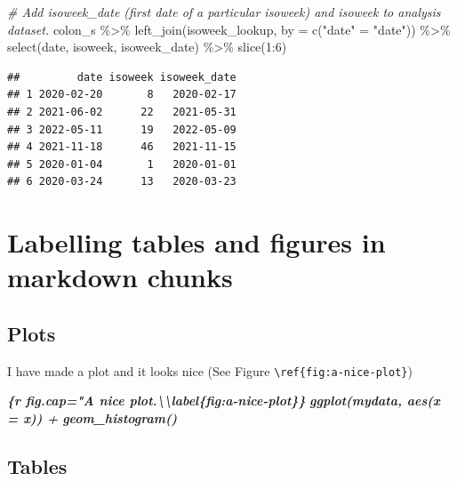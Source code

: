\documentclass[
]{book}
\newenvironment{Shaded}{\begin{snugshade}}{\end{snugshade}}
\newcommand{\AttributeTok}[1]{\textcolor[rgb]{0.77,0.63,0.00}{#1}}
\newcommand{\CommentTok}[1]{\textcolor[rgb]{0.56,0.35,0.01}{\textit{#1}}}
\newcommand{\DecValTok}[1]{\textcolor[rgb]{0.00,0.00,0.81}{#1}}
\newcommand{\FunctionTok}[1]{\textcolor[rgb]{0.00,0.00,0.00}{#1}}
\newcommand{\InformationTok}[1]{\textcolor[rgb]{0.56,0.35,0.01}{\textbf{\textit{#1}}}}
\newcommand{\NormalTok}[1]{#1}
\newcommand{\OtherTok}[1]{\textcolor[rgb]{0.56,0.35,0.01}{#1}}
\newcommand{\SpecialCharTok}[1]{\textcolor[rgb]{0.00,0.00,0.00}{#1}}
\newcommand{\StringTok}[1]{\textcolor[rgb]{0.31,0.60,0.02}{#1}}
\begin{document}
\begin{Shaded}
\begin{Highlighting}[]
\CommentTok{\# Add isoweek\_date (first date of a particular isoweek) and isoweek to analysis dataset. }
\NormalTok{colon\_s }\SpecialCharTok{\%\textgreater{}\%} 
  \FunctionTok{left\_join}\NormalTok{(isoweek\_lookup, }\AttributeTok{by =} \FunctionTok{c}\NormalTok{(}\StringTok{"date"} \OtherTok{=} \StringTok{"date"}\NormalTok{)) }\SpecialCharTok{\%\textgreater{}\%} 
  \FunctionTok{select}\NormalTok{(date, isoweek, isoweek\_date) }\SpecialCharTok{\%\textgreater{}\%} 
  \FunctionTok{slice}\NormalTok{(}\DecValTok{1}\SpecialCharTok{:}\DecValTok{6}\NormalTok{)}
\end{Highlighting}
\end{Shaded}

\begin{verbatim}
##         date isoweek isoweek_date
## 1 2020-02-20       8   2020-02-17
## 2 2021-06-02      22   2021-05-31
## 3 2022-05-11      19   2022-05-09
## 4 2021-11-18      46   2021-11-15
## 5 2020-01-04       1   2020-01-01
## 6 2020-03-24      13   2020-03-23
\end{verbatim}

\hypertarget{labelling-tables-and-figures-in-markdown-chunks}{%
\section{Labelling tables and figures in markdown chunks}\label{labelling-tables-and-figures-in-markdown-chunks}}

\hypertarget{plots}{%
\subsection{Plots}\label{plots}}

I have made a plot and it looks nice (See Figure \texttt{\textbackslash{}ref\{fig:a-nice-plot\}})

\begin{Shaded}
\begin{Highlighting}[]
\InformationTok{\textasciigrave{}\textasciigrave{}\textasciigrave{}\{r fig.cap="A nice plot.\textbackslash{}\textbackslash{}label\{fig:a{-}nice{-}plot\}\}}
\InformationTok{ggplot(mydata, aes(x = x)) +}
\InformationTok{  geom\_histogram()}
\InformationTok{\textasciigrave{}\textasciigrave{}\textasciigrave{}}
\end{Highlighting}
\end{Shaded}

\hypertarget{tables}{%
\subsection{Tables}\label{tables}}
\end{document}
